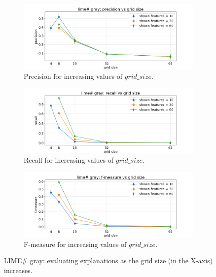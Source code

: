 \documentclass[12pt, twoside, a4paper]{report}
\begin{document}

\begin{figure}[h]
\centering
\begin{subfigure}[b]{\linewidth}
\includegraphics[width=\linewidth]{images/figs/VSGRID/limesharp gray/limesharp gray: precision vs grid size.png} 
\caption{Precision for increasing values of $grid\_size$.}
\label{subfig:limesharp_gray_prec_vs_gs}
\end{subfigure}
\begin{subfigure}[b]{\linewidth}
\includegraphics[width=\linewidth]{images/figs/VSGRID/limesharp gray/limesharp gray: recall vs grid size.png} 
\caption{Recall for increasing values of $grid\_size$.}
\label{subfig:limesharp_gray_rec_vs_gs}
\end{subfigure}
\begin{subfigure}[b]{\linewidth}
\includegraphics[width=\linewidth]{images/figs/VSGRID/limesharp gray/limesharp gray: f-measure vs grid size.png} 
\caption{F-measure for increasing values of $grid\_size$.}
\label{subfig:limesharp_gray_fmea_vs_gs}
\end{subfigure}
\caption{LIME\# gray: evaluating explanations as the grid size (in the X-axis) increases.}
\label{fig:limesharp_gray_vs_gs}
\end{figure}
\end{document}

